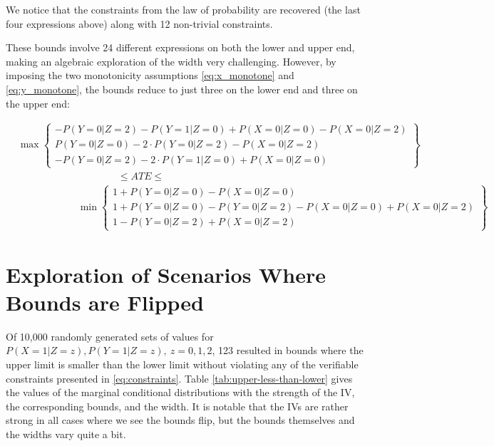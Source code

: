 \documentclass[
]{article}
\theoremstyle{plain}
\begin{document}
We notice that the constraints from the law of probability are recovered (the last four expressions above) along with 12 non-trivial constraints.

These bounds involve 24 different expressions on both the lower and upper end, making an algebraic exploration of the width very challenging. However, by imposing the two monotonicity assumptions \eqref{eq:x_monotone} and \eqref{eq:y_monotone}, the bounds reduce to just three on the lower end and three on the upper end:

\[
\begin{aligned}
    &\max
      \begin{Bmatrix}
        -P(Y = 0 | Z = 2) - P(Y = 1 | Z = 0) + P(X = 0 | Z = 0) - P(X = 0 | Z = 2) \\
        P(Y = 0 | Z = 0) - 2\cdot P(Y = 0 | Z = 2) - P(X = 0 | Z = 2) \\
        -P(Y = 0 | Z = 2) - 2\cdot P(Y = 1 | Z = 0) + P(X = 0 | Z = 0)
      \end{Bmatrix} \\
    &\qquad \qquad \qquad \qquad \qquad\le ATE \le \\
    &\qquad \qquad \qquad \min
      \begin{Bmatrix}
        1 + P(Y = 0 | Z = 0) - P(X = 0 | Z = 0) \\
        1 + P(Y = 0 | Z = 0) - P(Y = 0 | Z = 2) - P(X = 0 | Z = 0) + P(X = 0 | Z = 2) \\
        1 - P(Y = 0 | Z = 2) +  P(X = 0 | Z = 2)
      \end{Bmatrix}
\end{aligned}
\]


\hypertarget{exploration-of-scenarios-where-bounds-are-flipped}{%
\section{Exploration of Scenarios Where Bounds are Flipped}\label{exploration-of-scenarios-where-bounds-are-flipped}}

Of 10,000 randomly generated sets of values for \(P(X = 1 | Z = z), P(Y = 1 | Z = z),\ z = 0,1,2\), 123 resulted in bounds where the upper limit is smaller than the lower limit without violating any of the verifiable constraints presented in \eqref{eq:constraints}. Table \ref{tab:upper-less-than-lower} gives the values of the marginal conditional distributions with the strength of the IV, the corresponding bounds, and the width. It is notable that the IVs are rather strong in all cases where we see the bounds flip, but the bounds themselves and the widths vary quite a bit.
\end{document}
